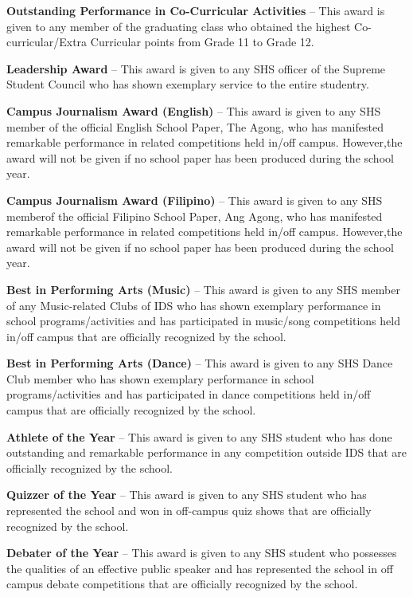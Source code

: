 \begin{enumerate}[label=(\Alph*)]
\begin{enumerate}[label=\Alph{enumi}.\arabic*]
		\textbf{Outstanding Performance in Co-Curricular Activities} – This award is given to any member of the graduating class who obtained the highest Co-curricular/Extra Curricular points from Grade 11 to Grade 12.
		
		\textbf{Leadership Award} – This award is given to any SHS officer of the Supreme Student Council who has shown exemplary service to the entire studentry.
		
		\textbf{Campus Journalism Award (English)} – This award is given to any SHS member of the official English School Paper, The Agong, who has manifested remarkable performance in related competitions held in/off campus. However,the award will not be given if no school paper has been produced during the school year.
		
		\textbf{Campus Journalism Award (Filipino)} – This award is given to any SHS memberof the official Filipino School Paper, Ang Agong, who has manifested remarkable performance in related competitions held in/off campus. However,the award will not be given if no school paper has been produced during the school year.
		
		\textbf{Best in Performing Arts (Music)} – This award is given to any SHS member of any Music-related Clubs of IDS who has shown exemplary performance in school programs/activities and has participated in music/song competitions held in/off campus that are officially recognized by the school.
		
		\textbf{Best in Performing Arts (Dance)} – This award is given to any SHS Dance Club member who has shown exemplary performance in school programs/activities and has participated in dance competitions held in/off campus that are officially recognized by the school.
		
		\textbf{Athlete of the Year} – This award is given to any SHS student who has done outstanding and remarkable performance in any competition outside IDS that are officially recognized by the school.
		
		\textbf{Quizzer of the Year} – This award is given to any SHS student who has represented the school and won in off-campus quiz shows that are officially recognized by the school.
		
		\textbf{Debater of the Year} – This award is given to any SHS student who possesses the qualities of an effective public speaker and has represented the school in off campus debate competitions that are officially recognized by the school.
		
	
		
		
		
		
		
		
		
		
		
	\end{enumerate}
	
	
	
	
\end{enumerate}